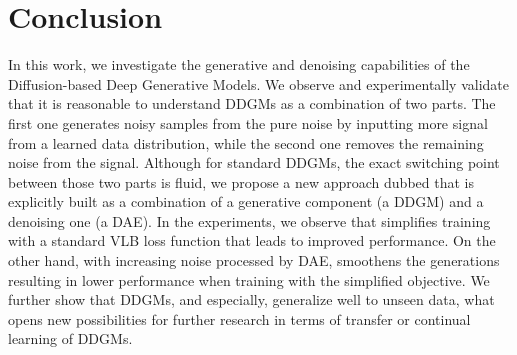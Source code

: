 \newpage










\section{Conclusion}
In this work, we investigate the generative and denoising capabilities of the Diffusion-based Deep Generative Models. We observe and experimentally validate that it is reasonable to understand DDGMs as a combination of two parts. The first one generates noisy samples from the pure noise by inputting more signal from a learned data distribution, while the second one removes the remaining noise from the signal. Although for standard DDGMs, the exact switching point between those two parts is fluid, we propose a new approach dubbed \ours{} that is explicitly built as a combination of a generative component (a DDGM) and a denoising one (a DAE). 
In the experiments, we observe that \ours{} simplifies training with a standard VLB loss function that leads to improved performance. On the other hand, with increasing noise processed by DAE, \ours{} smoothens the generations resulting in lower performance when training with the simplified objective. 
We further show that DDGMs, and \ours{} especially, generalize well to unseen data, what opens new possibilities for further research in terms of transfer or continual learning of DDGMs.

